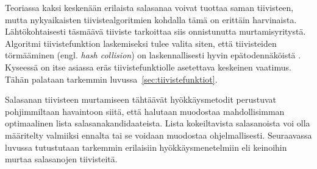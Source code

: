 Teoriassa kaksi keskenään erilaista salasanaa voivat tuottaa saman tiivisteen, mutta nykyaikaisten tiivistealgoritmien kohdalla tämä on erittäin harvinaista. Lähtökohtaisesti täsmäävä tiiviste tarkoittaa siis onnistunutta murtamisyritystä. Algoritmi tiivistefunktion laskemiseksi tulee valita siten, että tiivisteiden törmääminen (engl. \textit{hash collision}) on laskennallisesti hyvin epätodennäköistä \citep{menenez_handbook_1997}. Kyseessä on itse asiassa eräs tiivistefunktiolle asetettava keskeinen vaatimus. Tähän palataan tarkemmin luvussa~\ref{sec:tiivistefunktiot}.

Salasanan tiivisteen murtamiseen tähtäävät hyökkäysmetodit perustuvat pohjimmiltaan havaintoon siitä, että halutaan muodostaa mahdollisimman optimaalinen lista salasanakandidaateista. Lista kokeiltavista salasanoista voi olla määritelty valmiiksi ennalta tai se voidaan muodostaa ohjelmallisesti. Seuraavassa luvussa tutustutaan tarkemmin erilaisiin hyökkäysmenetelmiin eli keinoihin murtaa salasanojen tiivisteitä.
